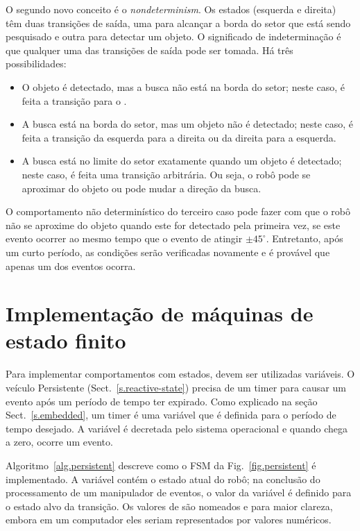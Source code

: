 O segundo novo conceito é o \emph{nondeterminism}. Os estados (esquerda e direita) têm duas transições de saída, uma para alcançar a borda do setor que está sendo pesquisado e outra para detectar um objeto. O significado de indeterminação é que qualquer uma das transições de saída pode ser tomada. Há três possibilidades:
\begin{itemize}
\item O objeto é detectado, mas a busca não está na borda do setor; neste caso, é feita a transição para o .
\item A busca está na borda do setor, mas um objeto não é detectado; neste caso, é feita a transição da esquerda para a direita ou da direita para a esquerda.
\item A busca está no limite do setor exatamente quando um objeto é detectado; neste caso, é feita uma transição arbitrária. Ou seja, o robô pode se aproximar do objeto ou pode mudar a direção da busca.
\end{itemize}
O comportamento não determinístico do terceiro caso pode fazer com que o robô não se aproxime do objeto quando este for detectado pela primeira vez, se este evento ocorrer ao mesmo tempo que o evento de atingir $\pm45^\circ$. Entretanto, após um curto período, as condições serão verificadas novamente e é provável que apenas um dos eventos ocorra.

\section{Implementação de máquinas de estado finito}\label{s.fsm-implementation}

Para implementar comportamentos com estados, devem ser utilizadas variáveis. O veículo Persistente (Sect.~\ref{s.reactive-state}) precisa de um timer para causar um evento após um período de tempo ter expirado. Como explicado na seção Sect.~\ref{s.embedded}, um timer é uma variável que é definida para o período de tempo desejado. A variável é decretada pelo sistema operacional e quando chega a zero, ocorre um evento.

Algoritmo~\ref{alg.persistent} descreve como o FSM da Fig.~\ref{fig.persistent} é implementado. A variável  contém o estado atual do robô; na conclusão do processamento de um manipulador de eventos, o valor da variável é definido para o estado alvo da transição. Os valores de  são nomeados  e  para maior clareza, embora em um computador eles seriam representados por valores numéricos.

